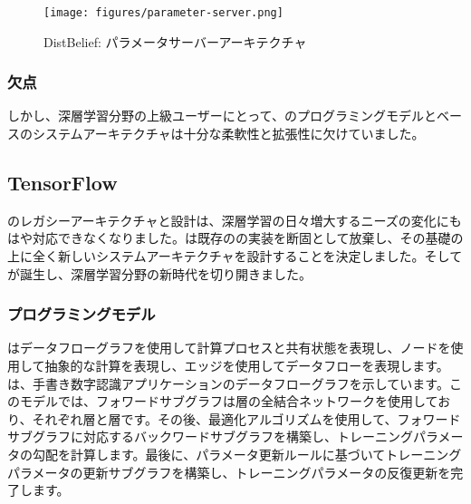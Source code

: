 \begin{content}
\begin{figure}[H]
\centering
\texttt{[image: figures/parameter-server.png]}
\caption{DistBelief: パラメータサーバーアーキテクチャ}
 \label{fig:parameter-server}
\end{figure}

\subsubsection{欠点}

しかし、深層学習分野の上級ユーザーにとって、のプログラミングモデルとベースのシステムアーキテクチャは十分な柔軟性と拡張性に欠けていました。

\begin{enum}
\end{enum}

\subsection{TensorFlow}

のレガシーアーキテクチャと設計は、深層学習の日々増大するニーズの変化にもはや対応できなくなりました。は既存のの実装を断固として放棄し、その基礎の上に全く新しいシステムアーキテクチャを設計することを決定しました。そしてが誕生し、深層学習分野の新時代を切り開きました。

\subsubsection{プログラミングモデル}

はデータフローグラフを使用して計算プロセスと共有状態を表現し、ノードを使用して抽象的な計算を表現し、エッジを使用してデータフローを表現します。は、手書き数字認識アプリケーションのデータフローグラフを示しています。このモデルでは、フォワードサブグラフは層の全結合ネットワークを使用しており、それぞれ層と層です。その後、最適化アルゴリズムを使用して、フォワードサブグラフに対応するバックワードサブグラフを構築し、トレーニングパラメータの勾配を計算します。最後に、パラメータ更新ルールに基づいてトレーニングパラメータの更新サブグラフを構築し、トレーニングパラメータの反復更新を完了します。


\end{content}
